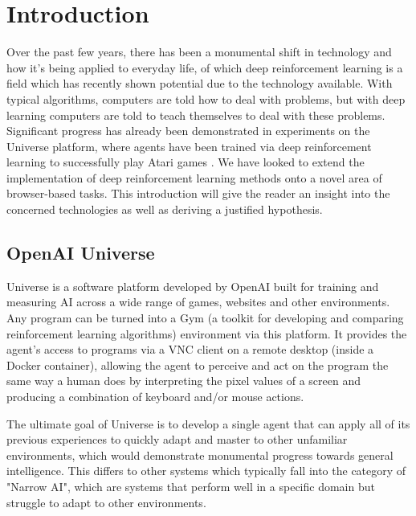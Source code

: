 \documentclass[conference]{IEEEtran}
\begin{document}
%
\IEEEpeerreviewmaketitle

\section{Introduction}
Over the past few years, there has been a monumental shift in technology and how it's being applied to everyday life, of which deep reinforcement learning is a field which has recently shown potential due to the technology available. With typical algorithms, computers are told how to deal with problems, but with deep learning computers are told to teach themselves to deal with these problems. Significant progress has already been demonstrated in experiments on the Universe platform, where agents have been trained via deep reinforcement learning to successfully play Atari games \cite{mnih2013playing}. We have looked to extend the implementation of deep reinforcement learning methods onto a novel area of browser-based tasks. This introduction will give the reader an insight into the concerned technologies as well as deriving a justified hypothesis. 

\subsection{OpenAI Universe}
Universe is a software platform developed by OpenAI built for training and measuring AI across a wide range of games, websites and other environments. Any program can be turned into a Gym (a toolkit for developing and comparing reinforcement learning algorithms) environment via this platform. It provides the agent's access to programs via a VNC client on a remote desktop (inside a Docker container), allowing the agent to perceive and act on the program the same way a human does by interpreting the pixel values of a screen and producing a combination of keyboard and/or mouse actions. 

The ultimate goal of Universe is to develop a single agent that can apply all of its previous experiences to quickly adapt and master to other unfamiliar environments, which would demonstrate monumental progress towards general intelligence. This differs to other systems which typically fall into the category of "Narrow AI", which are systems that perform well in a specific domain but struggle to adapt to other environments. 
\end{document}
